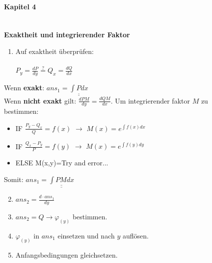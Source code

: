 \begin{figure}[!htb]
\begin{minipage}{0.3\textwidth}
\begin{tiny}
        
        \paragraph{Kapitel 4}\hfill\\
        \textbf{Exaktheit und integrierender Faktor}
        \begin{enumerate}
            \item Auf exaktheit überprüfen:\\\\ $P_y=\frac{dP}{dy}\stackrel{?}{=}Q_x=\frac{dQ}{dx}$
        \end{enumerate}
    Wenn \textbf{exakt}: $ans_1=\underline{\underline{\int Pdx}}$\\

    Wenn \textbf{nicht exakt} gilt: $\frac{dPM}{dy}=\frac{dQM}{dx}$. Um integrierender faktor $M$ zu bestimmen:
         \begin{itemize}
             \item  IF $\frac{P_y-Q_x}{Q}=f(x)$ $\rightarrow$ $M(x)=e^{\int f(x)dx}$
             \item IF $\frac{Q_x-P_y}{P}=f(y)$ $\rightarrow$ $M(x)=e^{\int f(y)dy}$
             \item ELSE M(x,y)=Try and error...
         \end{itemize}
         Somit: $ans_1=\underline{\underline{\int PM dx}}$


        \begin{enumerate}
        \setcounter{enumi}{1}
            \item $ans_2=\frac{d\cdot ans_1}{dy}$
            \item $ans_2=Q\rightarrow \varphi_{(y)}$ bestimmen.
            \item $\varphi_{(y)}$ in $ans_1$ einsetzen und nach $y$ auflösen.
            \item Anfangsbedingungen gleichsetzen.
        \end{enumerate}
       \end{tiny}
    \end{minipage}
\end{figure}
